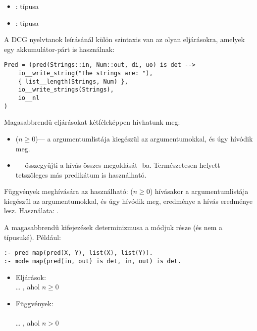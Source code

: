 \begin{itemize}
\item {}:  típusa 
\item {}:  típusa 
\end{itemize}

A DCG nyelvtanok leírásánál külön szintaxis van az olyan eljárásokra, amelyek
egy akkumulátor-párt is használnak:

\begin{verbatim}
Pred = (pred(Strings::in, Num::out, di, uo) is det -->
    io__write_string("The strings are: "),
    { list__length(Strings, Num) },
    io__write_strings(Strings),
    io__nl
)
\end{verbatim}

Magasabbrendû eljárásokat kétféleképpen hívhatunk meg:

\begin{itemize}
\item {} ($n\geq 0$)--- a 
argumentumlistája kiegészül az  argumentumokkal,
és úgy hívódik meg.
\item {} --- összegyûjti a 
hívás összes megoldását -ba. Természetesen  helyett
tetszõleges más predikátum is használható.
\end{itemize}

Függvények meghívására az  használható:
 ($n\geq 0$) hívásakor a 
argumentumlistája kiegészül az  argumentumokkal,
és úgy hívódik meg,  eredménye a hívás eredménye lesz. Használata:
.

A magasabbrendû kifejezések determinizmusa a módjuk része (és nem a típusuké).
Például:

\begin{verbatim}
:- pred map(pred(X, Y), list(X), list(Y)).
:- mode map(pred(in, out) is det, in, out) is det.
\end{verbatim}

\begin{itemize}
\item Eljárások:\\
\cd{,} \dots\cd{,} 
, ahol $n\geq 0$
\item Függvények:\\
   \\
\cd{,} \dots\cd{,} \cd{) =}
  , ahol $n>0$
\end{itemize}

